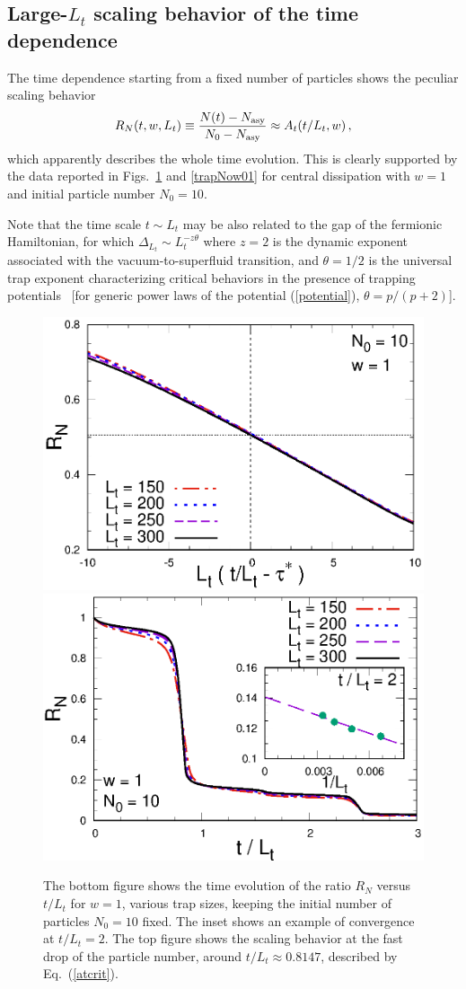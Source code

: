   
  \subsection{Large-$L_t$ scaling behavior of the time dependence}
  \label{trapscaling}
  
  
  The time dependence starting from a fixed number of particles shows
  the peculiar scaling behavior
  \begin{equation}
    R_N(t,w,L_t) \equiv {N(t)-N_{\rm asy}\over N_0-N_{\rm asy}} \approx
    A_t(t/L_t,w)\,,
    \label{rntrapn0}
  \end{equation}
  which apparently describes the whole time evolution.  This is clearly
  supported by the data reported in Figs.~\ref{trapNo} and
  \ref{trapNow01} for central dissipation with $w=1$ and initial
  particle number $N_0=10$.
  
  Note that the time scale $t\sim L_t$ may be also related to the gap of
  the fermionic Hamiltonian, for which $\Delta_{L_t} \sim
  L_t^{-z\theta}$ where $z=2$ is the dynamic exponent associated with
  the vacuum-to-superfluid transition, and $\theta=1/2$ is the universal
  trap exponent characterizing critical behaviors in the presence of
  trapping potentials~\cite{CV-09,CV-10,ACV-14,rossini2021coherent} [for generic
    power laws of the potential (\ref{potential}), $\theta=p/(p+2)$].
  
  \begin{figure}[!htb]
\centering
  \includegraphics[width=0.65\columnwidth]{imm/crit.eps}
  \includegraphics[width=0.65\columnwidth]{imm/RNtrapNo.eps}
  \caption{ The bottom figure shows the time evolution of the ratio
    $R_N$ versus $t/L_t$ for $w=1$, various trap sizes, keeping the
    initial number of particles $N_0=10$ fixed.  The inset shows an
    example of convergence at $t/L_t=2$.  The top figure shows the
    scaling behavior at the fast drop of the particle number, around
    $t/L_t\approx 0.8147$, described by Eq.~(\ref{atcrit}).  }
  \label{trapNo}
  \end{figure}
  
